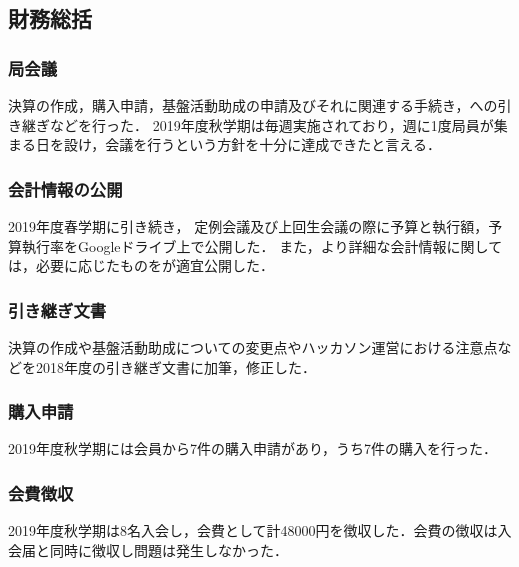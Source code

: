 \subsection*{財務総括}

\subsubsection*{局会議}
決算の作成，購入申請，基盤活動助成の申請及びそれに関連する手続き，\firstGrade{}への引き継ぎなどを行った．
2019年度秋学期は毎週実施されており，週に1度局員が集まる日を設け，会議を行うという方針を十分に達成できたと言える．

\subsubsection*{会計情報の公開}
2019年度春学期に引き続き， 定例会議及び上回生会議の際に予算と執行額，予算執行率をGoogleドライブ上で公開した．
また，より詳細な会計情報に関しては，必要に応じたものを\kaikeiStaff{}が適宜公開した．

\subsubsection*{引き継ぎ文書}
決算の作成や基盤活動助成についての変更点やハッカソン運営における注意点などを2018年度の引き継ぎ文書に加筆，修正した．

\subsubsection*{購入申請}
2019年度秋学期には会員から7件の購入申請があり，うち7件の購入を行った．

\subsubsection*{会費徴収}
2019年度秋学期は8名入会し，会費として計48000円を徴収した．会費の徴収は入会届と同時に徴収し問題は発生しなかった．
